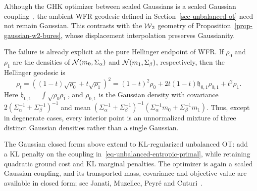 \begin{rem}\label{rem-gaussian-uot-geodesic-caveat}
	Although the GHK optimizer between scaled Gaussians is a scaled Gaussian coupling~\cite{YangZhang2026}, the ambient WFR geodesic defined in Section~\ref{sec-unbalanced-ot} need not remain Gaussian. This contrasts with the $\operatorname{\mathcal{W}}_2$ geometry of Proposition~\ref{prop-gaussian-w2-bures}, whose displacement interpolation preserves Gaussianity.

	The failure is already explicit at the pure Hellinger endpoint of WFR\@. If $\rho_0$ and $\rho_1$ are the densities of $\mathcal{N}(m_0,\Sigma_\alpha)$ and $\mathcal{N}(m_1,\Sigma_\beta)$, respectively, then the Hellinger geodesic is
	\begin{equation}\label{eq-hellinger-gaussian-three-mixture}
		\rho_t
		=
		\left((1-t)\sqrt{\rho_0}+t\sqrt{\rho_1}\right)^2
		=
		(1-t)^2\rho_0
		+2t(1-t)\mathfrak h_{0,1}\rho_{0,1}
		+t^2\rho_1.
	\end{equation}
	Here $\mathfrak h_{0,1}=\int\sqrt{\rho_0\rho_1}$, and $\rho_{0,1}$ is the Gaussian density with covariance $2(\Sigma_\alpha^{-1}+\Sigma_\beta^{-1})^{-1}$ and mean $(\Sigma_\alpha^{-1}+\Sigma_\beta^{-1})^{-1}(\Sigma_\alpha^{-1}m_0+\Sigma_\beta^{-1}m_1)$. Thus, except in degenerate cases, every interior point is an unnormalized mixture of three distinct Gaussian densities rather than a single Gaussian.
\end{rem}

\begin{rem}\label{rem-entropic-gaussian-uot}
	The Gaussian closed forms above extend to KL-regularized unbalanced OT: add a KL penalty on the coupling in~\eqref{eq-unbalanced-entropic-primal}, while retaining quadratic ground cost and KL marginal penalties. The optimizer is again a scaled Gaussian coupling, and its transported mass, covariance and objective value are available in closed form; see Janati, Muzellec, Peyr\'e and Cuturi~\cite{janati2020gaussian}.
\end{rem}

